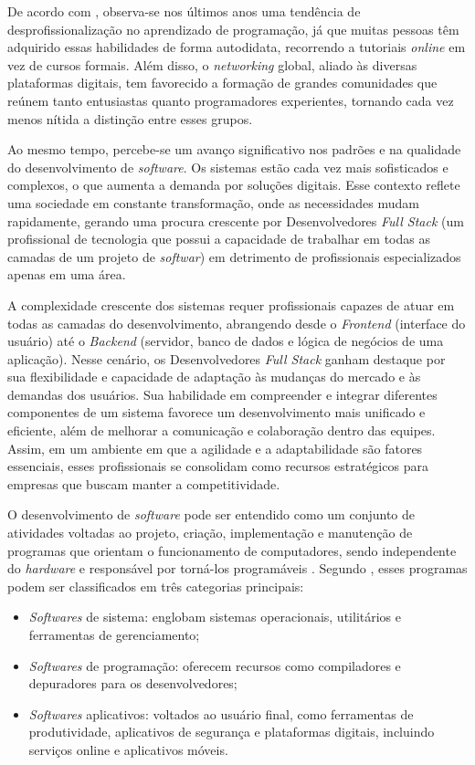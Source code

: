 \documentclass[english,brazilian]{UNISINOSartigo} %
\begin{document}
De acordo com , observa-se nos últimos anos uma tendência de desprofissionalização no aprendizado de programação, já que muitas pessoas têm adquirido essas habilidades de forma autodidata, recorrendo a tutoriais \textit{online} em vez de cursos formais. Além disso, o \textit{networking} global, aliado às diversas plataformas digitais, tem favorecido a formação de grandes comunidades que reúnem tanto entusiastas quanto programadores experientes, tornando cada vez menos nítida a distinção entre esses grupos.

Ao mesmo tempo, percebe-se um avanço significativo nos padrões e na qualidade do desenvolvimento de \textit{software}. Os sistemas estão cada vez mais sofisticados e complexos, o que aumenta a demanda por soluções digitais. Esse contexto reflete uma sociedade em constante transformação, onde as necessidades mudam rapidamente, gerando uma procura crescente por Desenvolvedores \textit{Full Stack} (um profissional de tecnologia que possui a capacidade de trabalhar em todas as camadas de um projeto de \textit{softwar}) em detrimento de profissionais especializados apenas em uma área.

A complexidade crescente dos sistemas requer profissionais capazes de atuar em todas as camadas do desenvolvimento, abrangendo desde o \textit{Frontend} (interface do usuário) até o \textit{Backend} (servidor, banco de dados e lógica de negócios de uma aplicação). Nesse cenário, os Desenvolvedores \textit{Full Stack} ganham destaque por sua flexibilidade e capacidade de adaptação às mudanças do mercado e às demandas dos usuários. Sua habilidade em compreender e integrar diferentes componentes de um sistema favorece um desenvolvimento mais unificado e eficiente, além de melhorar a comunicação e colaboração dentro das equipes. Assim, em um ambiente em que a agilidade e a adaptabilidade são fatores essenciais, esses profissionais se consolidam como recursos estratégicos para empresas que buscam manter a competitividade.

O desenvolvimento de \textit{software} pode ser entendido como um conjunto de atividades voltadas ao projeto, criação, implementação e manutenção de programas que orientam o funcionamento de computadores, sendo independente do \textit{hardware} e responsável por torná-los programáveis \cite{schwab2019}. Segundo , esses programas podem ser classificados em três categorias principais:

\begin{itemize}[leftmargin=1cm, itemsep=0.1em, topsep=0.1em]
    \item \textit{Softwares} de sistema: englobam sistemas operacionais, utilitários e ferramentas de gerenciamento;
    \item \textit{Softwares} de programação: oferecem recursos como compiladores e depuradores para os desenvolvedores;
    \item \textit{Softwares} aplicativos: voltados ao usuário final, como ferramentas de produtividade, aplicativos de segurança e plataformas digitais, incluindo serviços online e aplicativos móveis. 
\end{itemize}
\end{document}
